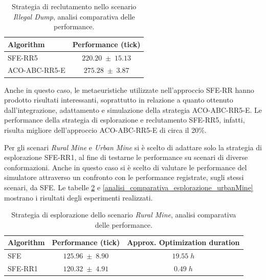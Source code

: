 \begin{table}[H]
    \centering
    \captionsetup{justification=centering, margin=2cm, font=footnotesize}
    \begin{tabular}{|l|c|}
    \hline
    \textbf{Algorithm}              & \textbf{Performance (tick)}       \\ \hline
    SFE-RR5                         & $220.20 \; \pm \; 15.13$           \\ \hline
    ACO-ABC-RR5-E                   & $275.28 \; \pm \; 3.87$           \\ \hline
    \end{tabular}%
    
    \caption{Strategia di reclutamento nello scenario \textit{Illegal Dump}, analisi comparativa delle performance.}
    \label{analisi_comparativa_reclutamento_dump}
\end{table}

Anche in questo caso, le metaeuristiche utilizzate nell'approccio SFE-RR hanno prodotto risultati interessanti, soprattutto in relazione a quanto ottenuto dall'integrazione, adattamento e simulazione della strategia ACO-ABC-RR5-E.
Le performance della strategia di esplorazione e reclutamento SFE-RR5, infatti, risulta migliore dell'approccio ACO-ABC-RR5-E di circa il 20\%.

Per gli scenari \textit{Rural Mine} e \textit{Urban Mine} si è scelto di adattare solo la strategia di esplorazione SFE-RR1, al fine di testarne le performance su scenari di diverse conformazioni.
Anche in questo caso si è scelto di valutare le performance del simulatore attraverso un confronto con le performance registrate, sugli stessi scenari, da SFE.
Le tabelle \ref{analisi_comparativa_esplorazione_ruralMine} e \ref{analisi_comparativa_esplorazione_urbanMine} mostrano i risultati degli esperimenti realizzati.

\begin{table}[H]
    \centering
    \captionsetup{justification=centering, margin=2cm, font=footnotesize}
    \begin{tabular}{|l|c|c|}
    \hline
    \textbf{Algorithm}              & \textbf{Performance (tick)}       & \textbf{Approx. Optimization duration}      \\ \hline
    SFE                             & $125.96 \; \pm \; 8.90$           &$19.55 \; h$       \\ \hline
    SFE-RR1                         & $120.32 \; \pm \; 4.91$           &$0.49  \; h$       \\ \hline
    \end{tabular}%
    
    \caption{Strategia di esplorazione dello scenario \textit{Rural Mine}, analisi comparativa delle performance.}
    \label{analisi_comparativa_esplorazione_ruralMine}
\end{table}

